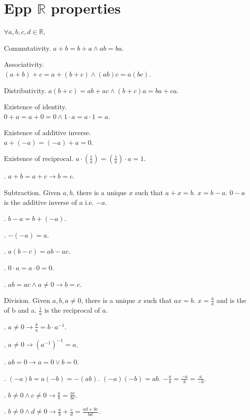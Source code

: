 \documentclass{slnotes}
\begin{document}
\chapter{Epp \(\mathbb{R}\) properties}
\(\forall a,b,c,d \in \mathbb{R}\),

 Commutativity. \(a + b = b + a \land ab = ba\).

 Associativity.\\\((a + b) + c = a + (b + c) \land (ab)c = a(bc)\).

 Distributivity. \(a(b + c) = ab + ac \land (b + c)a = ba + ca\).

 Existence of identity.\\\(0 + a = a + 0 = 0 \land 1 \cdot a = a \cdot 1 = a\).

 Existence of additive inverse.\\\(a + (-a) = (-a) + a = 0\).

 Existence of reciprocal. \(a \cdot \left(\frac{1}{a}\right) = \left(\frac{1}{a}\right) \cdot a = 1\).

. \(a + b = a + c \to b = c\).

 Subtraction. Given \(a, b\), there is a unique \(x\) such that \(a + x = b\). \(x = b - a\). \(0 - a\) is the additive inverse of \(a\) i.e. \(-a\).

. \(b - a = b + (-a)\).

. \(-(-a) = a\).

. \(a(b - c) = ab - ac\).

. \(0 \cdot a = a \cdot 0 = 0\).

. \(ab = ac \land a \neq 0 \to b = c\).

 Division. Given \(a, b, a \neq 0\), there is a unique \(x\) such that \(ax = b\). \(x = \frac{b}{a}\) and is the  of b and a. \(\frac{1}{a}\) is the reciprocal of \(a\).

. \(a \neq 0 \to \frac{b}{a} = b \cdot a^{-1}\).

. \(a \neq 0 \to (a^{-1})^{-1} = a\).

. \(ab = 0 \to a = 0 \lor b = 0\).

. \((-a)b = a(-b) = -(ab)\). \((-a)(-b) = ab\). \(-\frac{a}{b} = \frac{-a}{b} = \frac{a}{-b}\).

. \(b \neq 0 \land c \neq 0 \to \frac{a}{b} = \frac{ac}{bc}\).

. \(b \neq 0 \land d \neq 0 \to \frac{a}{b} + \frac{c}{d} = \frac{ad + bc}{bd}\).
\end{document}
